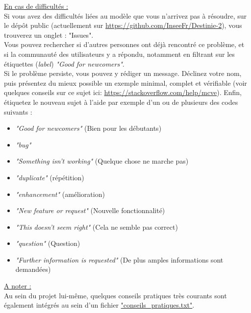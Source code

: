 \underline{En cas de difficultés :}\\
Si vous avez des difficultés liées au modèle que vous n'arrivez pas à résoudre, sur le dépôt public (actuellement sur \url{https://github.com/InseeFr/Destinie-2}), vous trouverez un onglet : "Issues".\\
Vous pouvez rechercher si d'autres personnes ont déjà rencontré ce problème, et si la communauté des utilisateurs y a répondu, notamment en filtrant sur les étiquettes (\textit{label}) \textit{"Good for newcomers"}.\\
Si le problème persiste, vous pouvez y rédiger un message. Déclinez votre nom, puis présentez du mieux possible un exemple minimal, complet et vérifiable (voir quelques conseils sur ce sujet ici: \url{https://stackoverflow.com/help/mcve}). Enfin, étiquetez le nouveau sujet à l'aide par exemple d'un ou de plusieurs des codes suivants :
\begin{itemize}
\item \textit{"Good for newcomers"} (Bien pour les débutants)
\item \textit{"bug"}
\item \textit{"Something isn't working"} (Quelque chose ne marche pas)
\item \textit{"duplicate"} (répétition)
\item \textit{"enhancement"} (amélioration)
\item \textit{"New feature or request"} (Nouvelle fonctionnalité)
\item \textit{"This doesn't seem right"} (Cela ne semble pas correct)
\item \textit{"question"} (Question)
\item \textit{"Further information is requested"} (De plus amples informations sont demandées)\\
\end{itemize}


\underline{A noter :}\\
Au sein du projet lui-même, quelques conseils pratiques très courants sont également intégrés au sein d'un fichier \url{"conseils_pratiques.txt"}.
